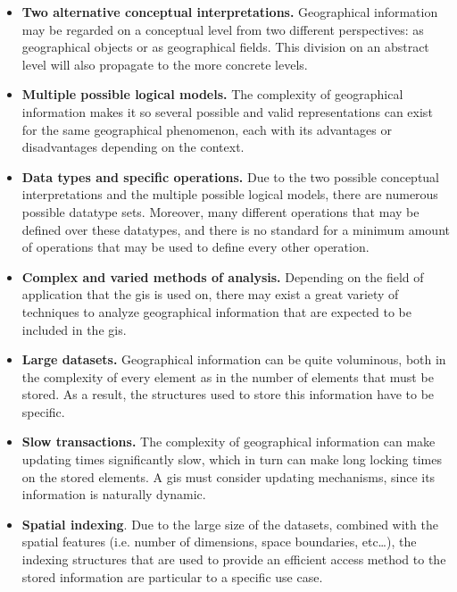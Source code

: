     \begin{itemize}
        \item \textbf{Two alternative conceptual interpretations.} Geographical information may be regarded on a conceptual level from two different perspectives: as geographical objects or as geographical fields. This division on an abstract level will also propagate to the more concrete levels.
        
        \item \textbf{Multiple possible logical models.} The complexity of geographical information makes it so several possible and valid representations can exist for the same geographical phenomenon, each with its advantages or disadvantages depending on the context.
        
        \item \textbf{Data types and specific operations.} Due to the two possible conceptual interpretations and the multiple possible logical models, there are numerous possible datatype sets. Moreover, many different operations that may be defined over these datatypes, and there is no standard for a minimum amount of operations that may be used to define every other operation.
        
        \item \textbf{Complex and varied methods of analysis.} Depending on the field of application that the \gls{gis} is used on, there may exist a great variety of techniques to analyze geographical information that are expected to be included in the \gls{gis}.
        
        \item \textbf{Large datasets.} Geographical information can be quite voluminous, both in the complexity of every element as in the number of elements that must be stored. As a result, the structures used to store this information have to be specific.
        
        \item \textbf{Slow transactions.} The complexity of geographical information can make updating times significantly slow, which in turn can make long locking times on the stored elements. A \gls{gis} must consider updating mechanisms, since its information is naturally dynamic.
        
        \item \textbf{Spatial indexing}. Due to the large size of the datasets, combined with the spatial features (i.e. number of dimensions, space boundaries, etc\dots), the indexing structures that are used to provide an efficient access method to the stored information are particular to a specific use case.
        

\end{itemize}
